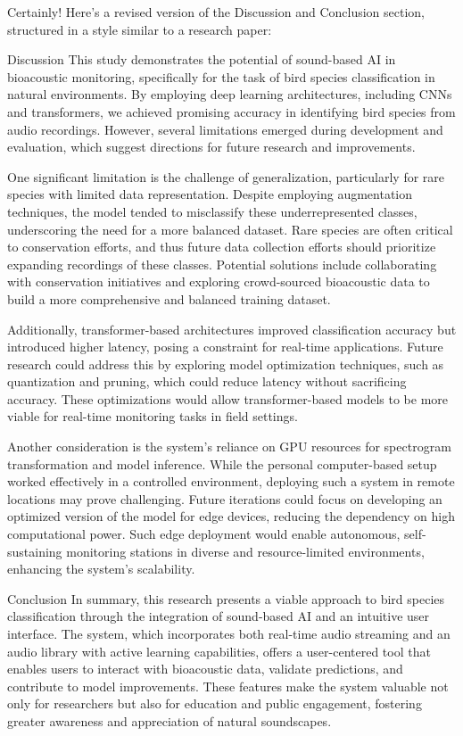 Certainly! Here’s a revised version of the Discussion and Conclusion section, structured in a style similar to a research paper:

Discussion
This study demonstrates the potential of sound-based AI in bioacoustic monitoring, specifically for the task of bird species classification in natural environments. By employing deep learning architectures, including CNNs and transformers, we achieved promising accuracy in identifying bird species from audio recordings. However, several limitations emerged during development and evaluation, which suggest directions for future research and improvements.

One significant limitation is the challenge of generalization, particularly for rare species with limited data representation. Despite employing augmentation techniques, the model tended to misclassify these underrepresented classes, underscoring the need for a more balanced dataset. Rare species are often critical to conservation efforts, and thus future data collection efforts should prioritize expanding recordings of these classes. Potential solutions include collaborating with conservation initiatives and exploring crowd-sourced bioacoustic data to build a more comprehensive and balanced training dataset.

Additionally, transformer-based architectures improved classification accuracy but introduced higher latency, posing a constraint for real-time applications. Future research could address this by exploring model optimization techniques, such as quantization and pruning, which could reduce latency without sacrificing accuracy. These optimizations would allow transformer-based models to be more viable for real-time monitoring tasks in field settings.

Another consideration is the system's reliance on GPU resources for spectrogram transformation and model inference. While the personal computer-based setup worked effectively in a controlled environment, deploying such a system in remote locations may prove challenging. Future iterations could focus on developing an optimized version of the model for edge devices, reducing the dependency on high computational power. Such edge deployment would enable autonomous, self-sustaining monitoring stations in diverse and resource-limited environments, enhancing the system’s scalability.

Conclusion
In summary, this research presents a viable approach to bird species classification through the integration of sound-based AI and an intuitive user interface. The system, which incorporates both real-time audio streaming and an audio library with active learning capabilities, offers a user-centered tool that enables users to interact with bioacoustic data, validate predictions, and contribute to model improvements. These features make the system valuable not only for researchers but also for education and public engagement, fostering greater awareness and appreciation of natural soundscapes.

